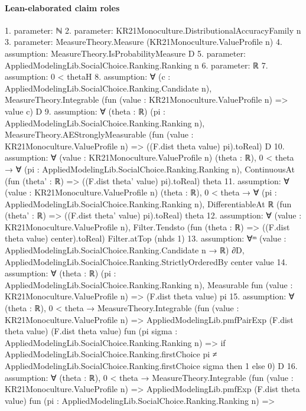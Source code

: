 \documentclass[10pt]{article}
\begin{document}
\paragraph{Lean-elaborated claim roles}\begin{ReviewVerbatim}
1. parameter: ℕ
2. parameter: KR21Monoculture.DistributionalAccuracyFamily n
3. parameter: MeasureTheory.Measure (KR21Monoculture.ValueProfile n)
4. assumption: MeasureTheory.IsProbabilityMeasure D
5. parameter: AppliedModelingLib.SocialChoice.Ranking.Ranking n
6. parameter: ℝ
7. assumption: 0 < thetaH
8. assumption: ∀ (c : AppliedModelingLib.SocialChoice.Ranking.Candidate n),
  MeasureTheory.Integrable (fun (value : KR21Monoculture.ValueProfile n) => value c) D
9. assumption: ∀ (theta : ℝ) (pi : AppliedModelingLib.SocialChoice.Ranking.Ranking n),
  MeasureTheory.AEStronglyMeasurable (fun (value : KR21Monoculture.ValueProfile n) => ((F.dist theta value) pi).toReal)
    D
10. assumption: ∀ (value : KR21Monoculture.ValueProfile n) (theta : ℝ),
  0 < theta →
    ∀ (pi : AppliedModelingLib.SocialChoice.Ranking.Ranking n),
      ContinuousAt (fun (theta' : ℝ) => ((F.dist theta' value) pi).toReal) theta
11. assumption: ∀ (value : KR21Monoculture.ValueProfile n) (theta : ℝ),
  0 < theta →
    ∀ (pi : AppliedModelingLib.SocialChoice.Ranking.Ranking n),
      DifferentiableAt ℝ (fun (theta' : ℝ) => ((F.dist theta' value) pi).toReal) theta
12. assumption: ∀ (value : KR21Monoculture.ValueProfile n),
  Filter.Tendsto (fun (theta : ℝ) => ((F.dist theta value) center).toReal) Filter.atTop (nhds 1)
13. assumption: ∀ᵐ (value : AppliedModelingLib.SocialChoice.Ranking.Candidate n → ℝ) ∂D,
  AppliedModelingLib.SocialChoice.Ranking.StrictlyOrderedBy center value
14. assumption: ∀ (theta : ℝ) (pi : AppliedModelingLib.SocialChoice.Ranking.Ranking n),
  Measurable fun (value : KR21Monoculture.ValueProfile n) => (F.dist theta value) pi
15. assumption: ∀ (theta : ℝ),
  0 < theta →
    MeasureTheory.Integrable
      (fun (value : KR21Monoculture.ValueProfile n) =>
        AppliedModelingLib.pmfPairExp (F.dist theta value) (F.dist theta value)
          fun (pi sigma : AppliedModelingLib.SocialChoice.Ranking.Ranking n) =>
          if
              AppliedModelingLib.SocialChoice.Ranking.firstChoice pi ≠
                AppliedModelingLib.SocialChoice.Ranking.firstChoice sigma then
            1
          else 0)
      D
16. assumption: ∀ (theta : ℝ),
  0 < theta →
    MeasureTheory.Integrable
      (fun (value : KR21Monoculture.ValueProfile n) =>
        AppliedModelingLib.pmfExp (F.dist theta value) fun (pi : AppliedModelingLib.SocialChoice.Ranking.Ranking n) =>

\end{ReviewVerbatim}
\end{document}
